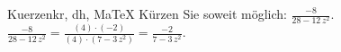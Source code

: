 \begin{MAufgabe}{Kuerzen}{kr, dh, MaTeX}
K\"urzen Sie soweit m\"oglich: $\frac{-8}{28 - 12\, z^2}$.\\ 
\ifLsg\MLoesung
\quad $\frac{-8}{28 - 12\, z^2}=\frac{(4)\cdot(-2)}{(4)\cdot(7 - 3\, z^2)}=\frac{-2}{7 - 3\, z^2}$.\else\relax\fi
 \end{MAufgabe}